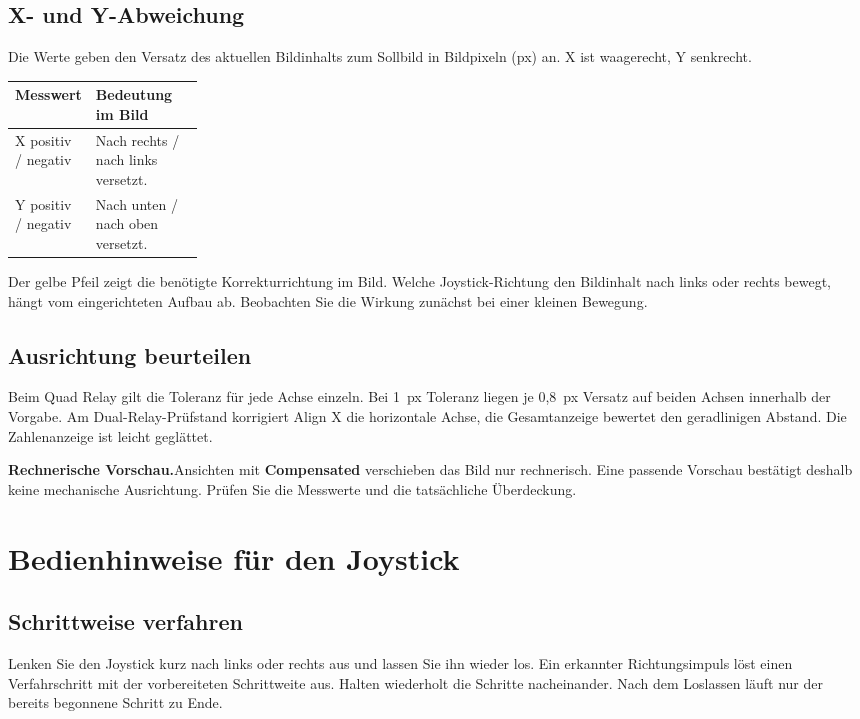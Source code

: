 \documentclass[a4paper,11pt]{article}
\newcommand{\Hinweis}[2]{\par\smallskip\textbf{#1}\enspace #2\par\smallskip}
\begin{document}
\subsection{X- und Y-Abweichung}

Die Werte geben den Versatz des aktuellen Bildinhalts zum Sollbild in
Bildpixeln (px) an. X ist waagerecht, Y senkrecht.

\begin{tabularx}{\linewidth}{@{}L{0.22\linewidth}Y@{}}
\toprule
\textbf{Messwert} & \textbf{Bedeutung im Bild} \\
\midrule
X positiv / negativ & Nach rechts / nach links versetzt. \\
Y positiv / negativ & Nach unten / nach oben versetzt. \\
\bottomrule
\end{tabularx}

Der gelbe Pfeil zeigt die benötigte Korrekturrichtung im Bild. Welche
Joystick-Richtung den Bildinhalt nach links oder rechts bewegt, hängt vom
eingerichteten Aufbau ab. Beobachten Sie die Wirkung zunächst bei einer kleinen
Bewegung.

\subsection{Ausrichtung beurteilen}

Beim Quad Relay gilt die Toleranz für jede Achse einzeln. Bei 1~px Toleranz liegen je 0,8~px Versatz auf beiden Achsen innerhalb der Vorgabe. Am Dual-Relay-Prüfstand korrigiert Align X die horizontale Achse, die Gesamtanzeige bewertet den geradlinigen Abstand. Die Zahlenanzeige ist leicht geglättet.

\Hinweis{Rechnerische Vorschau.}{Ansichten mit \textbf{Compensated} verschieben
das Bild nur rechnerisch. Eine passende Vorschau bestätigt deshalb keine
mechanische Ausrichtung. Prüfen Sie die Messwerte und die tatsächliche Überdeckung.}

\newpage
\section{Bedienhinweise für den Joystick}

\subsection{Schrittweise verfahren}

Lenken Sie den Joystick kurz nach links oder rechts aus und lassen Sie ihn
wieder los. Ein erkannter Richtungsimpuls löst einen Verfahrschritt mit der
vorbereiteten Schrittweite aus. Halten wiederholt die Schritte nacheinander.
Nach dem Loslassen läuft nur der bereits begonnene Schritt zu Ende.
\end{document}
